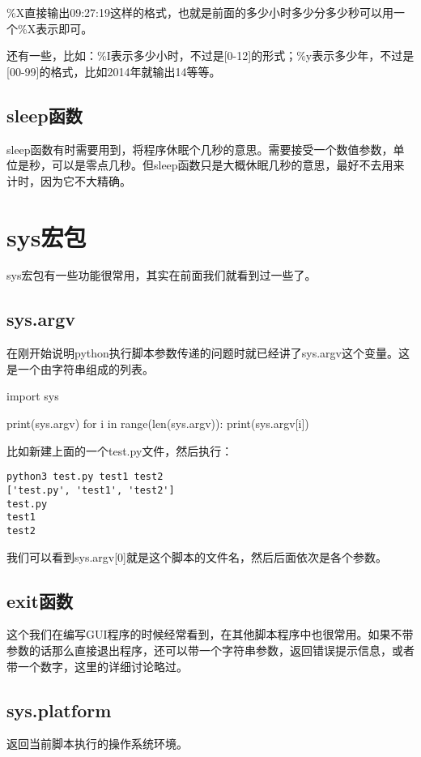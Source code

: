 \documentclass[12pt,oneside]{book}
\begin{document}
\begin{common-format}
\%{}X直接输出09:27:19这样的格式，也就是前面的多少小时多少分多少秒可以用一个\%{}X表示即可。

还有一些，比如：\%{}I表示多少小时，不过是[0-12]的形式；\%{}y表示多少年，不过是[00-99]的格式，比如2014年就输出14等等。


\section{sleep函数 }
sleep函数有时需要用到，将程序休眠个几秒的意思。需要接受一个数值参数，单位是秒，可以是零点几秒。但sleep函数只是大概休眠几秒的意思，最好不去用来计时，因为它不大精确。



\chapter{sys宏包}
sys宏包有一些功能很常用，其实在前面我们就看到过一些了。

\section{sys.argv}
在刚开始说明python执行脚本参数传递的问题时就已经讲了sys.argv这个变量。这是一个由字符串组成的列表。
\begin{tcbpython}
import sys

print(sys.argv)
for i in range(len(sys.argv)):
    print(sys.argv[i])
\end{tcbpython}
比如新建上面的一个test.py文件，然后执行：
\begin{Verbatim}
python3 test.py test1 test2
['test.py', 'test1', 'test2']
test.py
test1
test2
\end{Verbatim}
我们可以看到sys.argv[0]就是这个脚本的文件名，然后后面依次是各个参数。

\section{exit函数}
这个我们在编写GUI程序的时候经常看到，在其他脚本程序中也很常用。如果不带参数的话那么直接退出程序，还可以带一个字符串参数，返回错误提示信息，或者带一个数字，这里的详细讨论略过。


\section{sys.platform}
返回当前脚本执行的操作系统环境。


\end{common-format}
\end{document}
